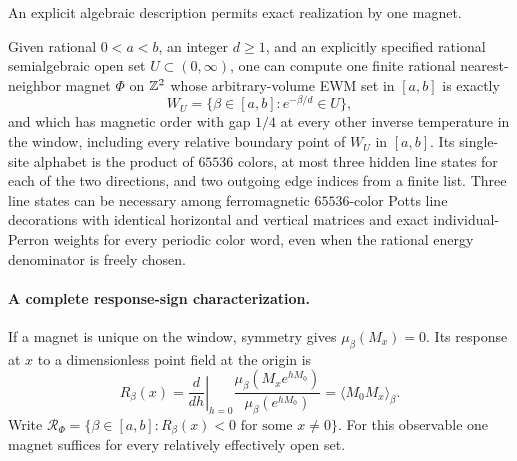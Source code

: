 An explicit algebraic description permits exact realization by one magnet.
\begin{theoremF}\label{thm:F}
Given rational \(0<a<b\), an integer \(d\ge1\), and an explicitly specified rational semialgebraic open set \(U\subset(0,\infty)\), one can compute one finite rational nearest-neighbor magnet \(\Phi\) on \(\mathbb Z^2\) whose arbitrary-volume EWM set in \([a,b]\) is exactly
\[
W_U=\{\beta\in[a,b]:e^{-\beta/d}\in U\},
\]
and which has magnetic order with gap \(1/4\) at every other inverse temperature in the window, including every relative boundary point of \(W_U\) in \([a,b]\). Its single-site alphabet is the product of \(65536\) colors, at most three hidden line states for each of the two directions, and two outgoing edge indices from a finite list. Three line states can be necessary among ferromagnetic \(65536\)-color Potts line decorations with identical horizontal and vertical matrices and exact individual-Perron weights for every periodic color word, even when the rational energy denominator is freely chosen.
\end{theoremF}

\paragraph{A complete response-sign characterization.}
If a magnet is unique on the window, symmetry gives \(\mu_\beta(M_x)=0\). Its response at \(x\) to a dimensionless point field at the origin is
\[
 R_\beta(x)=\left.\frac{d}{dh}\right|_{h=0}
 \frac{\mu_\beta(M_xe^{hM_0})}{\mu_\beta(e^{hM_0})}
 =\langle M_0M_x\rangle_\beta.
\]
Write \(\mathcal R_\Phi=\{\beta\in[a,b]:R_\beta(x)<0\text{ for some }x\ne0\}\).
For this observable one magnet suffices for every relatively effectively open set.

